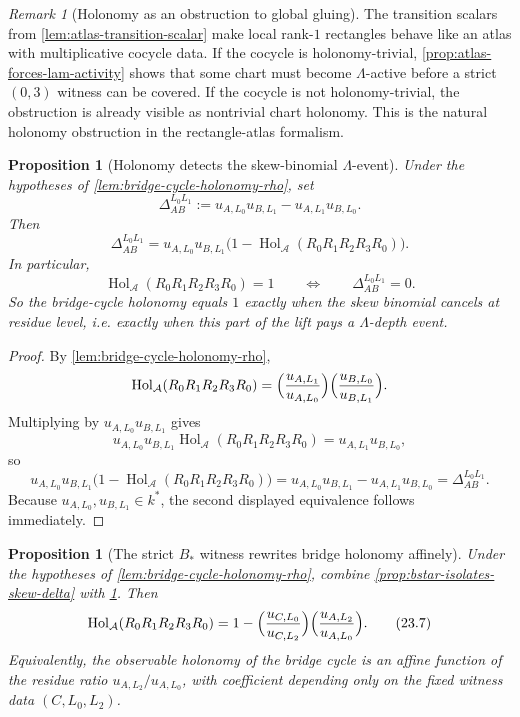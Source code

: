 \documentclass[11pt]{amsart}
\numberwithin{equation}{section}
\theoremstyle{plain}
\newtheorem{proposition}[theorem]{Proposition}
\theoremstyle{definition}
\theoremstyle{remark}
\newtheorem{remark}[theorem]{Remark}
\newcommand{\Lam}{\Lambda}
\begin{document}
\begin{remark}[Holonomy as an obstruction to global gluing]
\label{rem:atlas-holonomy-curvature}
The transition scalars from \cref{lem:atlas-transition-scalar} make local rank-$1$ rectangles behave like an atlas with multiplicative cocycle data. If the cocycle is holonomy-trivial, \cref{prop:atlas-forces-lam-activity} shows that some chart must become $\Lam$-active before a strict $(0,3)$ witness can be covered. If the cocycle is not holonomy-trivial, the obstruction is already visible as nontrivial chart holonomy. This is the natural holonomy obstruction in the rectangle-atlas formalism.
\end{remark}

\begin{proposition}[Holonomy detects the skew-binomial $\Lam$-event]
\label{prop:holonomy-detects-skew-delta}
Under the hypotheses of \cref{lem:bridge-cycle-holonomy-rho}, set
\[
\Delta_{AB}^{L_0L_1}:=u_{A,L_0}u_{B,L_1}-u_{A,L_1}u_{B,L_0}.
\]
Then
\[
\Delta_{AB}^{L_0L_1}
=u_{A,L_0}u_{B,L_1}\bigl(1-\operatorname{Hol}_{\mathcal A}(R_0R_1R_2R_3R_0)\bigr).
\tag{23.4}
\]
In particular,
\[
\operatorname{Hol}_{\mathcal A}(R_0R_1R_2R_3R_0)=1
\qquad\Longleftrightarrow\qquad
\Delta_{AB}^{L_0L_1}=0.
\tag{23.5}
\]
So the bridge-cycle holonomy equals $1$ exactly when the skew binomial cancels at residue level, i.e. exactly when this part of the lift pays a $\Lam$-depth event.
\end{proposition}

\begin{proof}
By \cref{lem:bridge-cycle-holonomy-rho},
\[
\operatorname{Hol}_{\mathcal A}(R_0R_1R_2R_3R_0)
=\Bigl(\frac{u_{A,L_1}}{u_{A,L_0}}\Bigr)
 \Bigl(\frac{u_{B,L_0}}{u_{B,L_1}}\Bigr).
\]
Multiplying by $u_{A,L_0}u_{B,L_1}$ gives
\[
u_{A,L_0}u_{B,L_1}\operatorname{Hol}_{\mathcal A}(R_0R_1R_2R_3R_0)=u_{A,L_1}u_{B,L_0},
\]
so
\[
u_{A,L_0}u_{B,L_1}\bigl(1-\operatorname{Hol}_{\mathcal A}(R_0R_1R_2R_3R_0)\bigr)
=u_{A,L_0}u_{B,L_1}-u_{A,L_1}u_{B,L_0}
=\Delta_{AB}^{L_0L_1}.
\]
Because $u_{A,L_0},u_{B,L_1}\in k^*$, the second displayed equivalence follows immediately.
\end{proof}

\begin{proposition}[The strict $B_*$ witness rewrites bridge holonomy affinely]
\label{prop:bstar-rewrites-bridge-holonomy}
Under the hypotheses of \cref{lem:bridge-cycle-holonomy-rho}, combine \cref{prop:bstar-isolates-skew-delta} with \cref{prop:holonomy-detects-skew-delta}. Then
\[
\operatorname{Hol}_{\mathcal A}(R_0R_1R_2R_3R_0)
=1-\Bigl(\frac{u_{C,L_0}}{u_{C,L_2}}\Bigr)
\Bigl(\frac{u_{A,L_2}}{u_{A,L_0}}\Bigr).
\tag{23.7}
\]
Equivalently, the observable holonomy of the bridge cycle is an affine function of the residue ratio $u_{A,L_2}/u_{A,L_0}$, with coefficient depending only on the fixed witness data $(C,L_0,L_2)$.
\end{proposition}
\end{document}
